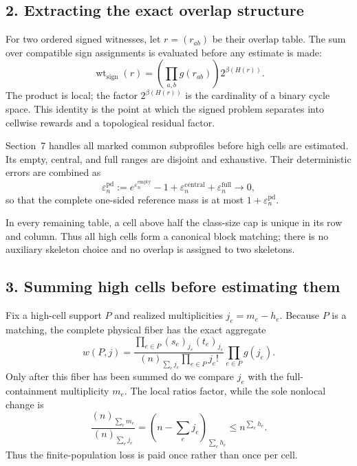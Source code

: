 \subsection*{2. Extracting the exact overlap structure}

For two ordered signed witnesses, let $r=(r_{ab})$ be their overlap table. The
sum over compatible sign assignments is evaluated before any estimate is
made:
\[
  \operatorname{wt}_{\mathrm{sign}}(r)
  =
  \left(\prod_{a,b}g(r_{ab})\right)2^{\beta(H(r))}.
\]
The product is local; the factor $2^{\beta(H(r))}$ is the cardinality of a
binary cycle space. This identity is the point at which the signed problem
separates into cellwise rewards and a topological residual factor.

Section~7 handles all marked common subprofiles before high cells are
estimated. Its empty, central, and full ranges are disjoint and exhaustive.
Their deterministic errors are combined as
\[
  \varepsilon_n^{\mathrm{pd}}
  :=e^{\varepsilon_n^{\mathrm{empty}}}-1
    +\varepsilon_n^{\mathrm{central}}
    +\varepsilon_n^{\mathrm{full}}
  \longrightarrow0,
\]
so that the complete one-sided reference mass is at most
$1+\varepsilon_n^{\mathrm{pd}}$.

In every remaining table, a cell above half the class-size cap is unique in its
row and column. Thus all high cells form a canonical block matching; there is
no auxiliary skeleton choice and no overlap is assigned to two skeletons.

\subsection*{3. Summing high cells before estimating them}

Fix a high-cell support $P$ and realized multiplicities
$j_e=m_e-h_e$. Because $P$ is a matching, the complete physical fiber has the
exact aggregate
\[
  w(P,j)
  =
  \frac{\prod_{e\in P}(s_e)_{j_e}(t_e)_{j_e}}
       {(n)_{\sum_ej_e}\prod_{e\in P}j_e!}
  \prod_{e\in P}g(j_e).
\]
Only after this fiber has been summed do we compare $j_e$ with the
full-containment multiplicity $m_e$. The local ratios factor, while the sole
nonlocal change is
\[
  \frac{(n)_{\sum_em_e}}{(n)_{\sum_ej_e}}
  =(n-\textstyle\sum_ej_e)_{\sum_eh_e}
  \le n^{\sum_eh_e}.
\]
Thus the finite-population loss is paid once rather than once per cell.

